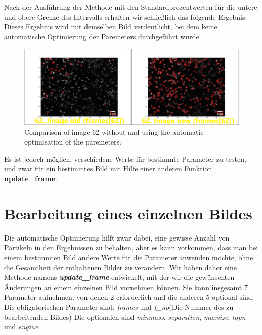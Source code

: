 Nach der Ausführung der Methode mit den Standardprozentwerten für die untere und obere Grenze des Intervalls erhalten wir schließlich das folgende Ergebnis. Dieses Ergebnis wird mit demselben Bild verdeutlicht, bei dem keine automatische Optimierung der Paremeters durchgeführt wurde.

\begin{figure}[H]
    \centering
    \includegraphics[scale=0.35]{Grafiken/trackpyBilder/comparison_62alt_Vs_62new.png}
    \caption{Comparison of image 62 without and using the automatic optimisation of the paremeters.}
\end{figure}
Es ist jedoch möglich, verschiedene Werte für bestimmte Parameter zu testen, und zwar für ein bestimmtes Bild mit Hilfe einer anderen Funktion \textbf{update\_frame}.

\section{Bearbeitung eines einzelnen Bildes \label{kap3_bearb_einz_bild}}
Die automatische Optimierung hilft zwar dabei, eine gewisse Anzahl von Partikeln in den Ergebnissen zu behalten, aber es kann vorkommen, dass man bei einem bestimmten Bild andere Werte für die Parameter anwenden möchte, ohne die Gesamtheit der enthaltenen Bilder zu verändern. 
Wir haben daher eine Methode namens \textit{\textbf{update\_frame}} entwickelt, mit der wir die gewünschten Änderungen an einem einzelnen Bild vornehmen können.
Sie kann insgesamt 7 Parameter aufnehmen, von denen 2 erforderlich und die anderen 5 optional sind. Die obligatorischen Parameter sind: \textit{frames} und \textit{f\_no}(Die Nummer des zu bearbeitenden Bildes)
Die optionalen sind \textit{minmass}, \textit{separation}, \textit{maxsize}, \textit{topn} und \textit{engine}.

